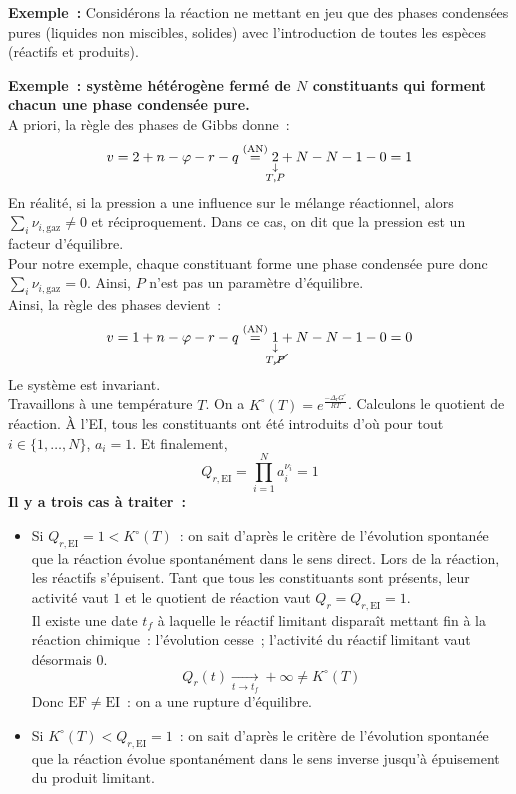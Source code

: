 \documentclass{article}
\newcommand{\Dr}{\Delta_{\mathrm{r}}}
\newcommand{\EI}{\mathrm{EI}}
\newcommand{\EF}{\mathrm{EF}}
\newcommand{\gaz}{\text{gaz}}
\begin{document}
\textbf{Exemple~:} Considérons la réaction ne mettant en jeu que des phases condensées pures (liquides non miscibles, solides) avec l’introduction de toutes les espèces (réactifs et produits).
\begin{tableau}
    \textbf{Exemple~: système hétérogène fermé de $N$ constituants qui forment chacun une phase condensée pure.}\\
    A priori, la règle des phases de Gibbs donne~:
    $$v=2+n-\varphi-r-q \overset{(\mathrm{AN})}{=} \underset{\mathclap{\substack{\downarrow\\ T,P}}}{2}+N-N-1-0=1$$
    En réalité, si la pression a une influence sur le mélange réactionnel, alors $\sum_i\nu_{i,\gaz} \neq 0$ et réciproquement. Dans ce cas, on dit que la pression est un facteur d'équilibre.\\
    Pour notre exemple, chaque constituant forme une phase condensée pure donc $\sum_i\nu_{i,\gaz} = 0$. Ainsi, $P$ n'est pas un paramètre d'équilibre.\\
    Ainsi, la règle des phases devient~:
    $$v=1+n-\varphi-r-q \overset{(\mathrm{AN})}{=} \underset{\mathclap{\substack{\downarrow\\ T,\cancel{P}}}}{1}+N-N-1-0=0$$
    Le système est invariant.\\
    \tcbline
    Travaillons à une température $T$. On a $K^\circ(T) = e^{\frac{-\Dr G^\circ}{RT}}$. Calculons le quotient de réaction. À l'EI, tous les constituants ont été introduits d'où pour tout $i\in \{1,\dots,N\}$, $a_i = 1$. Et finalement,
    $$Q_{r,\EI} = \prod_{i=1}^N a_i^{\nu_i} =1$$
    \textbf{Il y a trois cas à traiter~:}
    \begin{itemize}
        \item Si $Q_{r,\EI}=1 < K^\circ(T)$~: on sait d'après le critère de l'évolution spontanée que la réaction évolue spontanément dans le sens direct. Lors de la réaction, les réactifs s'épuisent. Tant que tous les constituants sont présents, leur activité vaut $1$ et le quotient de réaction vaut $Q_r = Q_{r,\EI} = 1$.\\
        Il existe une date $t_f$ à laquelle le réactif limitant disparaît mettant fin à la réaction chimique~: l'évolution cesse~; l'activité du réactif limitant vaut désormais $0$.
        $$Q_r(t) \xrightarrow[t\rightarrow t_f]{}+\infty\neq K^\circ(T)$$
        Donc $\EF \neq \EI$~: on a une rupture d'équilibre.
        \item Si $K^\circ(T) < Q_{r,\EI}=1$~: on sait d'après le critère de l'évolution spontanée que la réaction évolue spontanément dans le sens inverse jusqu'à épuisement du produit limitant.\\

\end{itemize}
\end{tableau}
\end{document}

